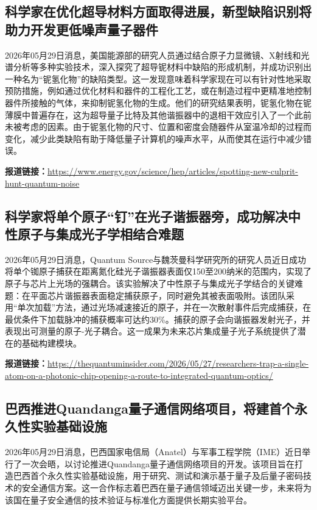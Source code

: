 \documentclass[12pt,a4paper]{ctexart}
\begin{document}
\subsection{ 科学家在优化超导材料方面取得进展，新型缺陷识别将助力开发更低噪声量子器件 }

2026年05月29日消息，美国能源部的研究人员通过结合原子力显微镜、X射线和光谱分析等多种实验技术，深入探究了超导铌材料中缺陷的形成机制，并成功识别出一种名为“铌氢化物”的缺陷类型。这一发现意味着科学家现在可以有针对性地采取预防措施，例如通过优化材料和器件的工程化工艺，或在制造过程中更精准地控制器件所接触的气体，来抑制铌氢化物的生成。他们的研究结果表明，铌氢化物在铌薄膜中普遍存在，这为超导量子比特及其他谐振器中的退相干效应引入了一个此前未被考虑的因素。由于铌氢化物的尺寸、位置和密度会随器件从室温冷却的过程而变化，减少此类缺陷有助于降低量子计算机的噪声水平，从而使其在运行中减少错误。

\noindent\textbf{报道链接：}\url{https://www.energy.gov/science/hep/articles/spotting-new-culprit-hunt-quantum-noise}

\subsection{ 科学家将单个原子“钉”在光子谐振器旁，成功解决中性原子与集成光子学相结合难题 }

2026年05月29日消息，Quantum Source与魏茨曼科学研究所的研究人员近日成功将单个铷原子捕获在距离氮化硅光子谐振器表面仅150至200纳米的范围内，实现了原子与芯片上光场的强耦合。该实验解决了中性原子与集成光子学结合的关键难题：在平面芯片谐振器表面稳定捕获原子，同时避免其被表面吸附。该团队采用“单次加载”方法，通过光场减速接近的原子，并在一次散射事件后完成捕获，在最优条件下加载脉冲的捕获概率可达约30\%。捕获的原子会向谐振器发射光子，并表现出可测量的原子-光子耦合。这一成果为未来芯片集成量子光子系统提供了潜在的基础构建模块。

\noindent\textbf{报道链接：}\url{https://thequantuminsider.com/2026/05/27/researchers-trap-a-single-atom-on-a-photonic-chip-opening-a-route-to-integrated-quantum-optics/}

\subsection{ 巴西推进Quandanga量子通信网络项目，将建首个永久性实验基础设施 }

2026年05月29日消息，巴西国家电信局（Anatel）与军事工程学院（IME）近日举行了一次会晤，以讨论推进Quandanga量子通信网络项目的开发。该项目旨在打造巴西首个永久性实验基础设施，用于研究、测试和演示基于量子及后量子密码技术的安全通信方案。这一合作标志着巴西在量子通信领域迈出关键一步，未来将为该国在量子安全通信的技术验证与标准化方面提供长期实验平台。
\end{document}
